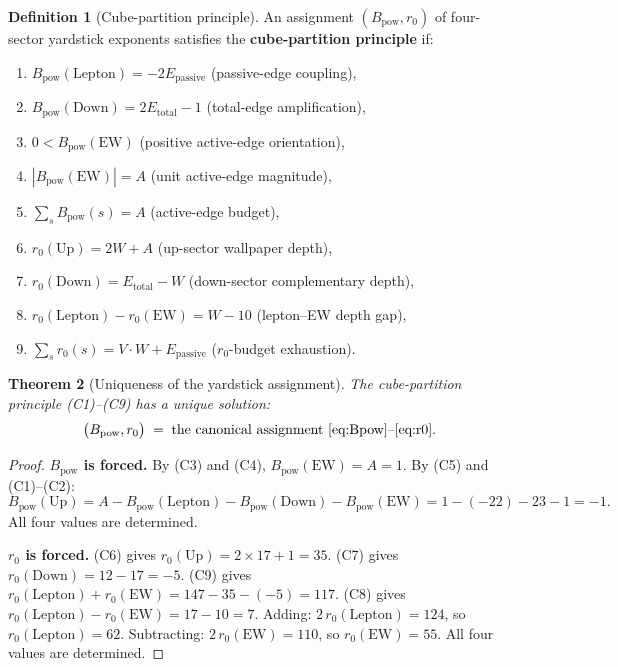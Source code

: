 \documentclass[11pt,a4paper]{article}
\newtheorem{theorem}{Theorem}[section]
\theoremstyle{definition}
\newtheorem{definition}[theorem]{Definition}
\theoremstyle{remark}
\newcommand{\Epass}{E_{\mathrm{passive}}}
\newcommand{\Etot}{E_{\mathrm{total}}}
\begin{document}
\begin{definition}[Cube-partition principle]
\label{def:cube_partition}
An assignment $(B_{\mathrm{pow}}, r_0)$ of four-sector yardstick exponents
satisfies the \textbf{cube-partition principle} if:
\begin{enumerate}[nosep,label=(C\arabic*)]
  \item $B_{\mathrm{pow}}(\mathrm{Lepton}) = -2\Epass$
    \quad(passive-edge coupling),
  \item $B_{\mathrm{pow}}(\mathrm{Down}) = 2\Etot - 1$
    \quad(total-edge amplification),
  \item $0 < B_{\mathrm{pow}}(\mathrm{EW})$
    \quad(positive active-edge orientation),
  \item $|B_{\mathrm{pow}}(\mathrm{EW})| = A$
    \quad(unit active-edge magnitude),
  \item $\sum_s B_{\mathrm{pow}}(s) = A$
    \quad(active-edge budget),
  \item $r_0(\mathrm{Up}) = 2W + A$
    \quad(up-sector wallpaper depth),
  \item $r_0(\mathrm{Down}) = \Etot - W$
    \quad(down-sector complementary depth),
  \item $r_0(\mathrm{Lepton}) - r_0(\mathrm{EW}) = W - 10$
    \quad(lepton--EW depth gap),
  \item $\sum_s r_0(s) = V \cdot W + \Epass$
    \quad($r_0$-budget exhaustion).
\end{enumerate}
\end{definition}

\begin{theorem}[Uniqueness of the yardstick assignment]
\label{thm:yardstick_unique}
The cube-partition principle (C1)--(C9) has a unique solution:
\begin{equation}
  \bigl(B_{\mathrm{pow}}, r_0\bigr)
  \;=\;
  \text{the canonical assignment~\eqref{eq:Bpow}--\eqref{eq:r0}.}
  \label{eq:yardstick_unique}
\end{equation}
\end{theorem}

\begin{proof}
\textbf{$B_{\mathrm{pow}}$ is forced.}\;
By (C3) and (C4), $B_{\mathrm{pow}}(\mathrm{EW}) = A = 1$.
By (C5) and (C1)--(C2):
\[
  B_{\mathrm{pow}}(\mathrm{Up})
  = A - B_{\mathrm{pow}}(\mathrm{Lepton}) - B_{\mathrm{pow}}(\mathrm{Down})
    - B_{\mathrm{pow}}(\mathrm{EW})
  = 1 - (-22) - 23 - 1 = -1.
\]
All four values are determined.

\textbf{$r_0$ is forced.}\;
(C6) gives $r_0(\mathrm{Up}) = 2 \times 17 + 1 = 35$.
(C7) gives $r_0(\mathrm{Down}) = 12 - 17 = -5$.
(C9) gives $r_0(\mathrm{Lepton}) + r_0(\mathrm{EW}) = 147 - 35 - (-5) = 117$.
(C8) gives $r_0(\mathrm{Lepton}) - r_0(\mathrm{EW}) = 17 - 10 = 7$.
Adding: $2\,r_0(\mathrm{Lepton}) = 124$, so $r_0(\mathrm{Lepton}) = 62$.
Subtracting: $2\,r_0(\mathrm{EW}) = 110$, so $r_0(\mathrm{EW}) = 55$.
All four values are determined.
\end{proof}
\end{document}

